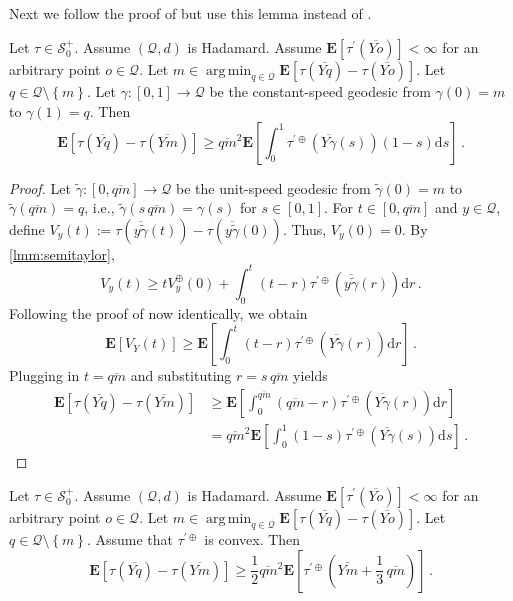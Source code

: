 \documentclass{article}
\newcommand*{\mc}[1]{\mathcal{#1}}
\newcommand{\lcb}{\left\lbrace} %
\newcommand{\rcb}{\right\rbrace} %
\newcommand{\cb}[1]{\lcb #1 \rcb} %
\newcommand{\lab}{\left[} %
\newcommand{\rab}{\right]} %
\newcommand{\ab}[1]{\lab #1 \rab} %
\newcommand{\abOf}[1]{\!\ab{#1}} %
\newcommand{\lb}{\left(} %
\newcommand{\rb}{\right)} %
\newcommand{\br}[1]{\lb #1 \rb} %
\newcommand{\brOf}[1]{\!\br{#1}} %
\newcommand{\E}{\mathbf{E}} %
\newcommand{\Eof}[1]{\E[#1]}
\newcommand{\EOf}[1]{\E\abOf{#1}}
\newcommand{\pr}{^\prime}
\newcommand{\eqfs}{\,.}
\newcommand{\dl}{\mathrm{d}} %
\DeclareMathOperator*{\argmin}{arg\,min}
\newcommand{\ol}[2]{\overline{#1#2}}
\newcommand{\tran}{\tau}
\newcommand{\dtran}{\tau\pr}
\newcommand{\ddrtran}{\tau^{\prime\oplus}}
\newcommand{\setcciz}{\mc S_0^+}
\newcommand{\rd}{^\oplus}
\begin{document}
%
Next we follow the proof of \cite[Theorem 5.4]{varinequ} but use this lemma instead of \cite[Theorem 4.17 (ii)]{varinequ}.
%
\begin{theorem}\label{thm:extended:varinequ}
    Let $\tran\in\setcciz$.
    Assume $(\mc Q, d)$ is Hadamard.
    Assume $\Eof{\dtran(\ol Yo)} < \infty$ for an arbitrary point $o \in\mc Q$.
    Let $m \in\argmin_{q\in\mc Q}\Eof{\tran(\ol Yq) - \tran(\ol Yo)}$. Let $q\in\mc Q\setminus\cb{m}$.
    Let $\gamma \colon [0, 1] \to \mc Q$ be the constant-speed geodesic from $\gamma(0) = m$ to $\gamma(1) =q$. 
    Then
    \begin{equation}
        \EOf{\tran(\ol Yq) - \tran(\ol Ym)} \geq \ol qm^2 \EOf{\int_{0}^{1} \ddrtran(\ol Y\gamma(s)) (1-s) \dl s}
        \eqfs
    \end{equation}
\end{theorem}
%
\begin{proof}
    Let $\tilde\gamma \colon [0, \ol qm] \to \mc Q$ be the unit-speed geodesic from $\tilde\gamma(0) = m$ to $\tilde\gamma(\ol qm) =q$, i.e., $\tilde\gamma(s\,\ol qm) = \gamma(s)$ for $s\in [0,1]$. 
    For $t\in[0, \ol qm]$ and $y\in \mc Q$, define $V_y(t) := \tran(\ol y{\tilde\gamma}(t)) - \tran(\ol y{\tilde\gamma}(0))$. Thus, $V_y(0) = 0$.
    By \cref{lmm:semitaylor},
    \begin{equation}\label{eq:taylorraw}
        V_y(t)
        \geq
        t  V_y\rd(0) + \int_{0}^t (t-r) \ddrtran(\ol y{\tilde\gamma}(r)) \dl r
        \eqfs
    \end{equation}
    Following the proof of \cite[Theorem 5.4]{varinequ} now identically, we obtain
    \begin{equation}
        \EOf{V_Y(t)} \geq \EOf{\int_{0}^t (t-r) \ddrtran(\ol Y{\tilde\gamma}(r)) \dl r}
        \eqfs
    \end{equation}
    Plugging in $t = \ol qm$ and substituting $r=s\,\ol qm$ yields
    \begin{align}
        \EOf{\tran(\ol Yq) - \tran(\ol Ym)} 
        &\geq 
        \EOf{\int_{0}^{\ol qm} (\ol qm-r) \ddrtran(\ol Y{\tilde\gamma}(r)) \dl r}
        \\&=
        \ol qm^2\EOf{\int_{0}^{1} (1-s) \ddrtran(\ol Y{\gamma}(s)) \dl s}
        \eqfs
    \end{align}
\end{proof}
%
\begin{corollary}
    Let $\tran\in\setcciz$.
    Assume $(\mc Q, d)$ is Hadamard.
    Assume $\Eof{\dtran(\ol Yo)} < \infty$ for an arbitrary point $o \in\mc Q$.
    Let $m \in\argmin_{q\in\mc Q}\Eof{\tran(\ol Yq) - \tran(\ol Yo)}$. Let $q\in\mc Q\setminus\cb{m}$.
    Assume that $\ddrtran$ is convex.
    Then
    \begin{equation}
        \EOf{\tran(\ol Yq) - \tran(\ol Ym)} \geq \frac12 \ol qm^2 \EOf{\ddrtran\brOf{\ol Ym + \frac13\, \ol qm}}
        \eqfs
    \end{equation}
\end{corollary}
\end{document}
